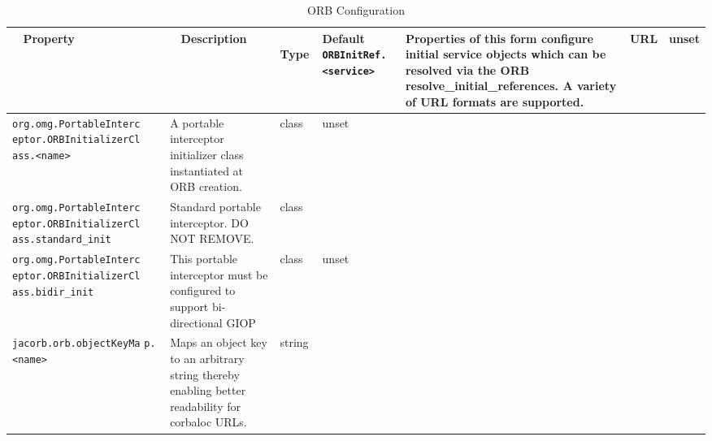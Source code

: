 \begin{small}
\begin{longtable}{|p{5cm}|p{7.5cm}|p{1.5cm}|p{1.5cm}|}
\caption{ORB Configuration}\\
\hline
~ \hfill \textbf {Property} \hfill ~ & ~ \hfill \textbf {Description}
\hfill ~ & ~ \hfill \textbf {Type} \hfill ~ & \hfill \textbf{Default} \endhead
\hline
\verb"ORBInitRef.<service>" & Properties of this form configure
initial service objects which can be resolved via the ORB
resolve\_initial\_references. A variety of URL formats are
supported. & URL & unset \\
\hline
\verb"org.omg.PortableInterc"
\verb"eptor.ORBInitializerCl"
\verb"ass.<name>" & A portable interceptor initializer class
instantiated at ORB creation. & class & unset \\
\hline
\verb"org.omg.PortableInterc"
\verb"eptor.ORBInitializerCl"
\verb"ass.standard_init" & Standard portable interceptor. DO NOT
REMOVE. & class &  \\
\hline
\verb"org.omg.PortableInterc"
\verb"eptor.ORBInitializerCl"
\verb"ass.bidir_init" & This portable interceptor must be configured
to support bi-directional GIOP & class & unset \\
\hline
\verb"jacorb.orb.objectKeyMa"
\verb"p.<name>" & Maps an object key to an arbitrary string thereby
enabling better readability for corbaloc URLs. & string & \\
\hline


\end{longtable}
\end{small}
